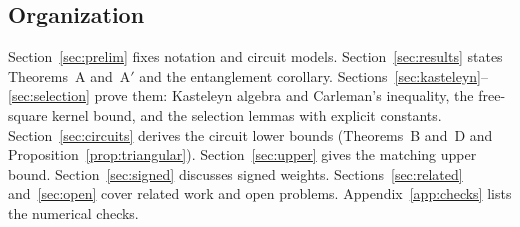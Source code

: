 \subsection{Organization}
Section~\ref{sec:prelim} fixes notation and circuit models. Section~\ref{sec:results} states Theorems~A and~A$'$ and the entanglement corollary. Sections~\ref{sec:kasteleyn}--\ref{sec:selection} prove them: Kasteleyn algebra and Carleman's inequality, the free-square kernel bound, and the selection lemmas with explicit constants. Section~\ref{sec:circuits} derives the circuit lower bounds (Theorems~B and~D and Proposition~\ref{prop:triangular}). Section~\ref{sec:upper} gives the matching upper bound. Section~\ref{sec:signed} discusses signed weights. Sections~\ref{sec:related} and~\ref{sec:open} cover related work and open problems. Appendix~\ref{app:checks} lists the numerical checks.
